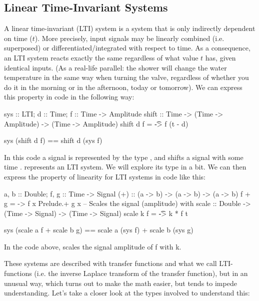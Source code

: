 \subsection{Linear Time-Invariant Systems}\label{sec:ltisprimer}
A linear time-invariant (LTI) system is a system that is only indirectly dependent on time ($t$). More precisely, input signals may be linearly combined (i.e. superposed) or differentiated/integrated with respect to time.
As a consequence, an LTI system reacts exactly the same regardless of what value $t$ has, given identical inputs. (As a real-life parallel: the shower will change the water temperature in the same way when turning the valve, regardless of whether you do it in the morning or in the afternoon, today or tomorrow). We can express this property in code in the following way:
\begin{codeeq}
sys :: LTI; d :: Time; f :: Time -> Amplitude
shift :: Time -> (Time -> Amplitude) -> (Time -> Amplitude)
shift d f = \t -> f (t - d)
\end{codeeq}
\begin{codeeq}
sys (shift d f) == shift d (sys f)
\end{codeeq}
In this code a signal is represented by the type , and  shifts a signal  with some time .  represents an LTI system. We will explore its type in a bit.
We can then express the property of linearity for LTI systems in code like this:
\begin{codeeq}
a, b :: Double; f, g :: Time -> Signal
(+) :: (a -> b) -> (a -> b) -> (a -> b)
f + g = \x -> f x Prelude.+ g x
-- Scales the signal (amplitude) with
scale :: Double -> (Time -> Signal) -> (Time -> Signal)
scale k f = \t -> k * f t
\end{codeeq}
\begin{codeeq}
sys (scale a f + scale b g) 
    == scale a (sys f) + scale b (sys g)
\end{codeeq}
In the code above,  scales the signal amplitude of f with k.

These systems are described with transfer functions and what we call LTI-functions (i.e. the inverse Laplace transform of the transfer function), but in an unusual way, which turns out to make the math easier, but tends to impede understanding. Let's take a closer look at the types involved to understand this:

